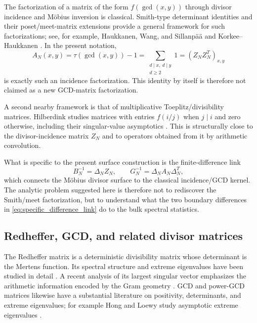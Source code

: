 \documentclass[11pt]{amsart}
\numberwithin{equation}{section}
\theoremstyle{plain}
\theoremstyle{definition}
\theoremstyle{remark}
\begin{document}
The factorization of a matrix of the form $f(\gcd(x,y))$ through divisor incidence and M\"obius inversion is classical.  Smith-type determinant identities and their poset/meet-matrix extensions provide a general framework for such factorizations; see, for example, Haukkanen, Wang, and Sillanp\"a\"a \cite{HaukkanenWangSillanpaa1997} and Korkee--Haukkanen \cite{KorkeeHaukkanen2003}.  In the present notation,
\begin{equation}
A_N(x,y)=\tau(\gcd(x,y))-1
=\sum_{\substack{d\mid x,\ d\mid y\\d\ge2}}1
=(Z_NZ_N^T)_{x,y}
\label{eq:classical_gcd_incidence_factorization}
\end{equation}
is exactly such an incidence factorization.  This identity by itself is therefore not claimed as a new GCD-matrix factorization.

A second nearby framework is that of multiplicative Toeplitz/divisibility matrices.  Hilberdink studies matrices with entries $f(i/j)$ when $j\mid i$ and zero otherwise, including their singular-value asymptotics \cite{Hilberdink2017}.  This is structurally close to the divisor-incidence matrix $Z_N$ and to operators obtained from it by arithmetic convolution.

What is specific to the present surface construction is the finite-difference link
\begin{equation}
B_N^{-1}=\Delta_NZ_N,
\qquad
G_N^{-1}=\Delta_NA_N\Delta_N^T,
\label{eq:specific_difference_link}
\end{equation}
which connects the M\"obius divisor surface to the classical incidence/GCD kernel.  The analytic problem suggested here is therefore not to rediscover the Smith/meet factorization, but to understand what the two boundary differences in \eqref{eq:specific_difference_link} do to the bulk spectral statistics.

\subsection{Redheffer, GCD, and related divisor matrices}
\label{subsec:redheffer_gcd}

The Redheffer matrix is a deterministic divisibility matrix whose determinant is the Mertens function.  Its spectral structure and extreme eigenvalues have been studied in detail \cite{BarrettJarvis1992}.  A recent analysis of its largest singular vector emphasizes the arithmetic information encoded by the Gram geometry \cite{ClementSteinerberger2025}.  GCD and power-GCD matrices likewise have a substantial literature on positivity, determinants, and extreme eigenvalues; for example Hong and Loewy study asymptotic extreme eigenvalues \cite{HongLoewy2004}.
\end{document}
